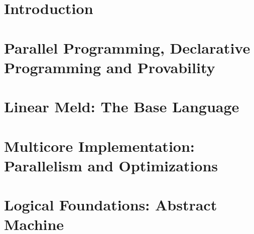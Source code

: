 \documentclass[12pt]{cmuthesis}
\theoremstyle{indented}
\begin{document}

\thispagestyle{empty}
\clearpage

\frontmatter


\begin{acknowledgments}

\end{acknowledgments}

\tableofcontents
\listoffigures
\listoftables
\renewcommand{\listtheoremname}{List of Equations}
\listoftheorems

\mainmatter


%
%
%
%
%

\mainmatter
\chapter{Introduction}


\chapter{Parallel Programming, Declarative Programming and Provability}


\chapter{Linear Meld: The Base Language}



\chapter{Multicore Implementation: Parallelism and Optimizations}\label{chapter:implementation}


\chapter{Logical Foundations: Abstract Machine}

\end{document}
